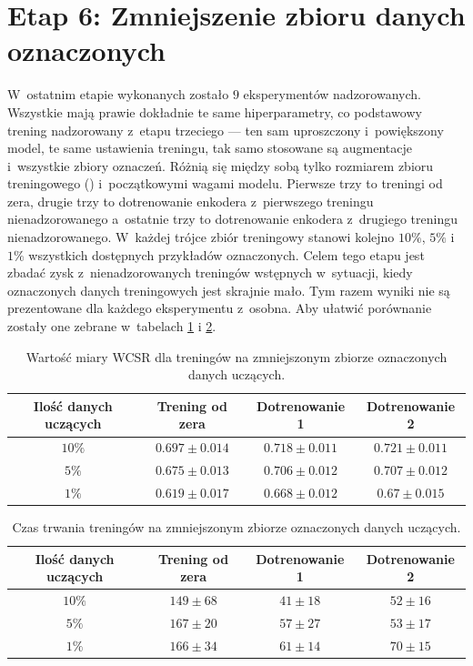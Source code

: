 \section{Etap 6: Zmniejszenie zbioru danych oznaczonych}

W~ostatnim etapie wykonanych zostało $9$ eksperymentów nadzorowanych. Wszystkie mają prawie dokładnie te same hiperparametry, co podstawowy trening nadzorowany z~etapu trzeciego --- ten sam uproszczony i~powiększony model, te same ustawienia treningu, tak samo stosowane są augmentacje i~wszystkie zbiory oznaczeń. Różnią się między sobą tylko rozmiarem zbioru treningowego () i~początkowymi wagami modelu. Pierwsze trzy to treningi od zera, drugie trzy to dotrenowanie enkodera z~pierwszego treningu nienadzorowanego a~ostatnie trzy to dotrenowanie enkodera z~drugiego treningu nienadzorowanego. W~każdej trójce zbiór treningowy stanowi kolejno $10\%$, $5\%$ i $1\%$ wszystkich dostępnych przykładów oznaczonych. Celem tego etapu jest zbadać zysk z~nienadzorowanych treningów wstępnych w~sytuacji, kiedy oznaczonych danych treningowych jest skrajnie mało. Tym razem wyniki nie są prezentowane dla każdego eksperymentu z~osobna. Aby ułatwić porównanie zostały one zebrane w~tabelach \ref{tab:results_small-ds-wcsr} i \ref{tab:results_small-ds-epoch}.

\begin{table}
    \centering
    \caption{Wartość miary WCSR dla treningów na zmniejszonym zbiorze oznaczonych danych uczących.}
    \label{tab:results_small-ds-wcsr}
    \begin{tabular}{|c|c|c|c|}
        \hline Ilość danych uczących & Trening od zera & Dotrenowanie 1 & Dotrenowanie 2 \\ \hline
        $10\%$  & $0.697 \pm 0.014$ & $0.718 \pm 0.011$ & $0.721 \pm 0.011$ \\
        $5\%$   & $0.675 \pm 0.013$ & $0.706 \pm 0.012$ & $0.707 \pm 0.012$ \\
        $1\%$   & $0.619 \pm 0.017$ & $0.668 \pm 0.012$ & $0.67 \pm 0.015$ \\ \hline
    \end{tabular}
\end{table}

\begin{table}
    \centering
    \caption{Czas trwania treningów na zmniejszonym zbiorze oznaczonych danych uczących.}
    \label{tab:results_small-ds-epoch}
    \begin{tabular}{|c|c|c|c|}
        \hline Ilość danych uczących & Trening od zera & Dotrenowanie 1 & Dotrenowanie 2 \\ \hline
        $10\%$  & $149 \pm 68$ & $41 \pm 18$ & $52 \pm 16$ \\
        $5\%$   & $167 \pm 20$ & $57 \pm 27$ & $53 \pm 17$ \\
        $1\%$   & $166 \pm 34$ & $61 \pm 14$ & $70 \pm 15$ \\ \hline
    \end{tabular}
\end{table}

